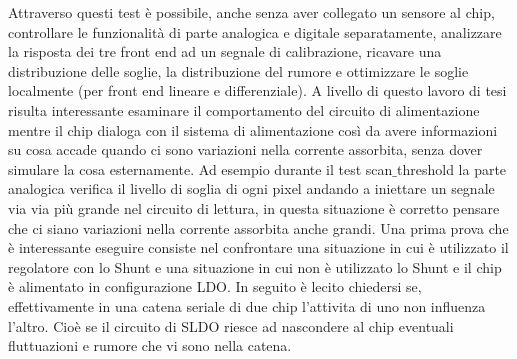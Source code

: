 Attraverso questi test è possibile, anche senza aver collegato un sensore al chip, controllare le funzionalità di parte analogica e digitale separatamente, analizzare la risposta dei tre front end ad un segnale di calibrazione, ricavare una distribuzione delle soglie, la distribuzione del rumore e ottimizzare le soglie localmente (per front end lineare e differenziale). 
A livello di questo lavoro di tesi risulta interessante esaminare il comportamento del circuito di alimentazione mentre il chip dialoga con il sistema di alimentazione così da avere informazioni su cosa accade quando ci sono variazioni nella corrente assorbita, senza dover simulare la cosa esternamente. 
Ad esempio durante il test scan$\_$threshold la parte analogica verifica il livello di soglia di ogni pixel andando a iniettare un segnale via via più grande nel circuito di lettura, in questa situazione è corretto pensare che ci siano variazioni nella corrente assorbita anche grandi. 
Una prima prova che è interessante eseguire consiste nel confrontare una situazione in cui è utilizzato il regolatore con lo Shunt e una situazione in cui non è utilizzato lo Shunt e il chip è alimentato in configurazione LDO. In seguito è lecito chiedersi se, effettivamente in una catena seriale di due chip l'attivita di uno non influenza l'altro. Cioè se il circuito di SLDO riesce ad nascondere al chip eventuali fluttuazioni e rumore  che vi sono nella catena.

